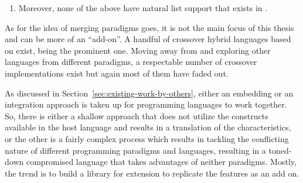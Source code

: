 \documentclass[thesis-solanki.tex]{subfiles}
\begin{document}
\begin{enumerate}
\item
  Moreover, none of the above have natural list support that exists
  in .
\end{enumerate}

As for the idea of merging paradigms goes, it is not the main focus of this thesis and can be more of an
``add-on''. A handful of crossover hybrid languages based on  exist,
 \cite{website:curry} being the prominent one.
Moving away from  and exploring other languages from different paradigms, a respectable number of
crossover implementations exist but again most of them have faded out.


As discussed in Section~\ref{sec:existing-work-by-others},
either an embedding or an integration approach is taken up for programming languages to work together.
So, there is either a shallow approach that does not utilize the constructs available in the host language and
results in a translation of the characteristics, or the other is a fairly complex process which results in tackling
the conflicting nature of different programming paradigms and languages, resulting in a toned-down compromised
language that takes advantages of neither paradigms.
Mostly, the trend is to build a library for extension to replicate the features as an add on.
\end{document}
